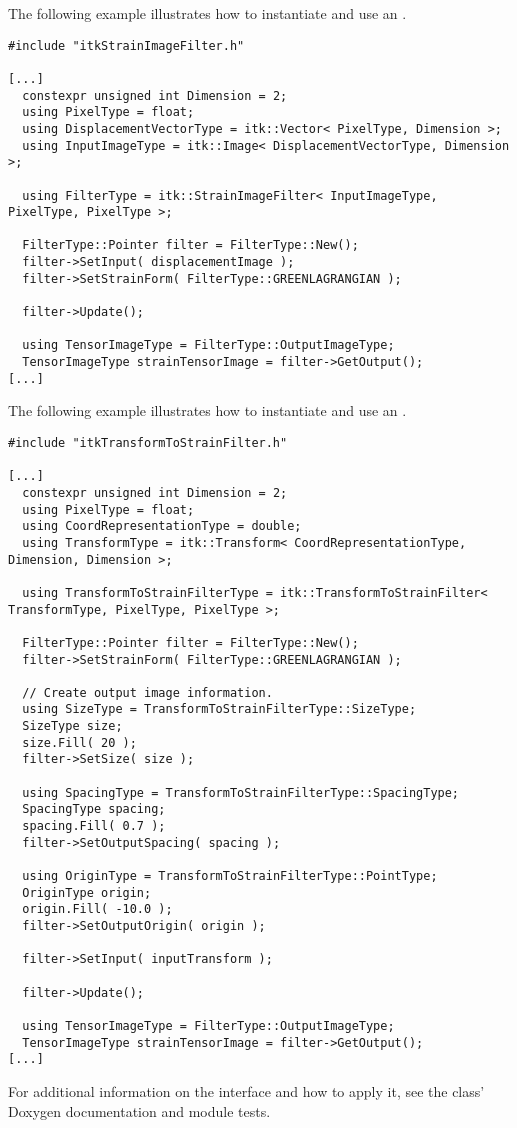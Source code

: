 \documentclass{InsightArticle}
\begin{document}
The following example illustrates how to instantiate and use an .

\begin{verbatim}
#include "itkStrainImageFilter.h"

[...]
  constexpr unsigned int Dimension = 2;
  using PixelType = float;
  using DisplacementVectorType = itk::Vector< PixelType, Dimension >;
  using InputImageType = itk::Image< DisplacementVectorType, Dimension >;

  using FilterType = itk::StrainImageFilter< InputImageType, PixelType, PixelType >;

  FilterType::Pointer filter = FilterType::New();
  filter->SetInput( displacementImage );
  filter->SetStrainForm( FilterType::GREENLAGRANGIAN );

  filter->Update();

  using TensorImageType = FilterType::OutputImageType;
  TensorImageType strainTensorImage = filter->GetOutput();
[...]
\end{verbatim}

The following example illustrates how to instantiate and use an
.

\begin{verbatim}
#include "itkTransformToStrainFilter.h"

[...]
  constexpr unsigned int Dimension = 2;
  using PixelType = float;
  using CoordRepresentationType = double;
  using TransformType = itk::Transform< CoordRepresentationType, Dimension, Dimension >;

  using TransformToStrainFilterType = itk::TransformToStrainFilter< TransformType, PixelType, PixelType >;

  FilterType::Pointer filter = FilterType::New();
  filter->SetStrainForm( FilterType::GREENLAGRANGIAN );

  // Create output image information.
  using SizeType = TransformToStrainFilterType::SizeType;
  SizeType size;
  size.Fill( 20 );
  filter->SetSize( size );

  using SpacingType = TransformToStrainFilterType::SpacingType;
  SpacingType spacing;
  spacing.Fill( 0.7 );
  filter->SetOutputSpacing( spacing );

  using OriginType = TransformToStrainFilterType::PointType;
  OriginType origin;
  origin.Fill( -10.0 );
  filter->SetOutputOrigin( origin );

  filter->SetInput( inputTransform );

  filter->Update();

  using TensorImageType = FilterType::OutputImageType;
  TensorImageType strainTensorImage = filter->GetOutput();
[...]
\end{verbatim}

For additional information on the interface and how to apply it, see the
class' Doxygen documentation and module tests.

%
%



\end{document}
